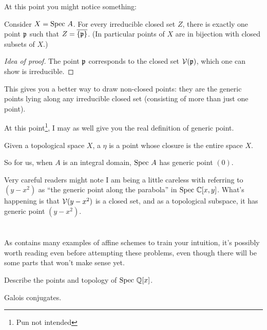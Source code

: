 At this point you might notice something:
\begin{theorem}
	Consider $X = \text{Spec } A$.
	For every irreducible closed set $Z$,
	there is exactly one point $\mathfrak p$ such that $Z = \overline{\{\mathfrak p\}}$.
	(In particular points of $X$ are in bijection
	with closed subsets of $X$.)
\end{theorem}
\begin{proof}
	[Idea of proof]
	The point $\mathfrak p$ corresponds to the closed set $\mathcal V(\mathfrak p)$,
	which one can show is irreducible.
\end{proof}
This gives you a better way to draw non-closed points:
they are the generic points lying along any irreducible closed set
(consisting of more than just one point).

At this point\footnote{Pun not intended},
I may as well give you the real definition of generic point.
\begin{definition}
	Given a topological space $X$,
	a  $\eta$
	is a point whose closure is the entire space $X$.
\end{definition}
So for us, when $A$ is an integral domain,
$\text{Spec } A$ has generic point $(0)$.
\begin{abuse}
	Very careful readers might note I am being a little careless
	with referring to $(y-x^2)$ as
	``the generic point along the parabola''
	in $\text{Spec } \mathbb C[x,y]$.
	What's happening is that $\mathcal V(y-x^2)$ is a closed set,
	and as a topological subspace, it has generic point $(y-x^2)$.
\end{abuse}

\section{\problemhead}
As  contains many
examples of affine schemes to train your intuition,
it's possibly worth reading even before attempting these problems,
even though there will be some parts that won't make sense yet.

\begin{problem}
	[{$\Spec \QQ[x]$}]
	Describe the points and topology of $\Spec \QQ[x]$.
	\begin{hint}
		Galois conjugates.
	\end{hint}
\end{problem}


